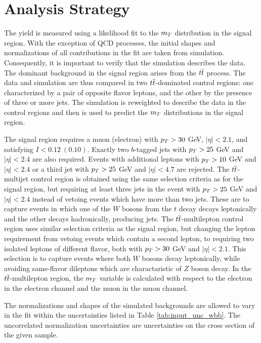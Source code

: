 \section{Analysis Strategy}\label{sec:wbb_analysisstrategy}
The \wbb yield is measured using a likelihood fit 
 to the $m_T$ distribution in the signal region.
With the exception of QCD processes,
 the initial shapes and normalizations of all contributions
 in the fit are taken from simulation.
Consequently, it is important
 to verify that 
 the simulation describes the data.
The dominant background in the signal region arises 
 from the $t\overline{t}$ process.
The data and simulation
 are thus compared in two $t\overline{t}$-dominated control regions:
 one characterized by a pair of opposite flavor leptons,
 and the other by the presence of three or more jets.
The simulation is reweighted to describe the data in the control regions
 and then is used to predict the $m_T$ distributions
 in the signal region.

The signal region requires a muon (electron)
 with {$p_T > 30$} GeV,
 {$|\eta| < 2.1$}, and satisfying {$I < 0.12~(0.10)$}.
Exactly two $b$-tagged jets with
 {$p_T > 25$} GeV and
 {$|\eta| < 2.4$} are also required. %
Events with additional leptons with
 {$p_T > 10$} GeV and {$|\eta| < 2.4$} or
 a third jet with {$p_T > 25$} GeV and {$|\eta| < 4.7$}
 are rejected.
The $t\overline{t}$-multijet control region is obtained
 using the same selection criteria as for the signal region,
 but requiring at least three jets in the event
 with {$p_T>25$} GeV and {$|\eta|<2.4$} instead of
 vetoing events which have more than two jets.
These are to capture events in which one of the
 $W$ bosons from the $t$ decay decays leptonically
 and the other decays hadronically, producing jets.
The $t\overline{t}$-multilepton control region uses
 similar selection criteria as the signal region,
 but changing the lepton requirement from vetoing
 events which contain a second lepton,
 to requiring two isolated leptons of different flavor,
 both with {$p_T>30$} GeV and {$|\eta|<2.1$}.
This selection is to capture \ttbar events where
 both $W$ bosons decay leptonically, 
 while avoiding same-flavor dileptons which 
 are charactaristic of $Z$ boson decay.
In the $t\overline{t}$-multilepton region,
 the $m_T$ variable is calculated with respect to
 the electron in the electron channel
 and the muon in the muon channel.

The normalizations and shapes of the simulated backgrounds
 are allowed to vary in the fit
 within the uncertainties listed in Table \ref{tab:input_unc_wbb}.
The uncorrelated normalization uncertainties
 are uncertainties on the cross section of
 the given sample.


